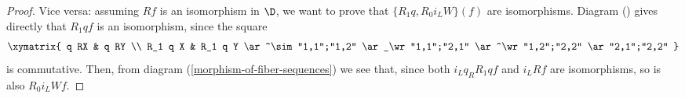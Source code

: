 \begin{proof}
Vice versa: assuming $Rf$ is an isomorphism in $\D$, we want to prove that $\{R_1 q , R_0i_LW \}(f)$ are isomorphisms.  Diagram () gives directly that $R_1 qf$ is an isomorphism, since the square
\[
	\xymatrix{
	  q RX	& q RY \\
	  R_1 q X	& R_1 q Y
	  \ar^\sim "1,1";"1,2" 
	  \ar_\wr "1,1";"2,1" 
	  \ar^\wr "1,2";"2,2" 
	  \ar "2,1";"2,2" 
	}
\] is commutative.
%
Then, from diagram (\ref{morphism-of-fiber-sequences}) we see that, since both $i_Lq_RR_1qf$ and $i_LRf$ are isomorphisms, so is also $R_0i_LWf$. 
\end{proof}

